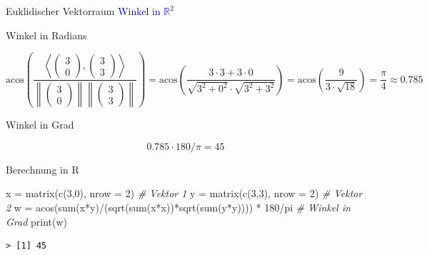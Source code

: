 \documentclass[
  8pt,
  ignorenonframetext,
]{beamer}
\newenvironment{Shaded}{\begin{snugshade}}{\end{snugshade}}
\newcommand{\AttributeTok}[1]{\textcolor[rgb]{0.77,0.63,0.00}{#1}}
\newcommand{\CommentTok}[1]{\textcolor[rgb]{0.56,0.35,0.01}{\textit{#1}}}
\newcommand{\DecValTok}[1]{\textcolor[rgb]{0.00,0.00,0.81}{#1}}
\newcommand{\FunctionTok}[1]{\textcolor[rgb]{0.00,0.00,0.00}{#1}}
\newcommand{\NormalTok}[1]{#1}
\newcommand{\OtherTok}[1]{\textcolor[rgb]{0.56,0.35,0.01}{#1}}
\newcommand{\SpecialCharTok}[1]{\textcolor[rgb]{0.00,0.00,0.00}{#1}}
\begin{document}
\begin{frame}[fragile]{Euklidischer Vektorraum}
\protect\hypertarget{euklidischer-vektorraum-10}{}
\textcolor{darkblue}{Winkel in $\mathbb{R}^2$}

\footnotesize

Winkel in Radians

\tiny

\begin{equation}
\mbox{acos}
\left(\frac{\left\langle \begin{pmatrix} 3 \\ 0 \end{pmatrix}, \begin{pmatrix} 3 \\ 3 \end{pmatrix} \right\rangle}
           {\left\lVert  \begin{pmatrix} 3 \\ 0 \end{pmatrix} \right\rVert \left\lVert \begin{pmatrix} 3 \\ 3 \end{pmatrix} \right\rVert}
\right)
= \mbox{acos}
\left(\frac{3\cdot 3 + 3 \cdot 0}
           {\sqrt{3^2 + 0^2} \cdot \sqrt{3^2 + 3^2}}
\right)
= \mbox{acos}
\left(\frac{9}
           {3 \cdot \sqrt{18}}
\right)
= \frac{\pi}{4}
\approx 0.785
\end{equation}

\footnotesize

Winkel in Grad

\begin{equation}
0.785 \cdot 180/\pi = 45
\end{equation}

Berechnung in R

\begin{Shaded}
\begin{Highlighting}[]
\NormalTok{x }\OtherTok{=} \FunctionTok{matrix}\NormalTok{(}\FunctionTok{c}\NormalTok{(}\DecValTok{3}\NormalTok{,}\DecValTok{0}\NormalTok{), }\AttributeTok{nrow =} \DecValTok{2}\NormalTok{)                                 }\CommentTok{\# Vektor 1}
\NormalTok{y }\OtherTok{=} \FunctionTok{matrix}\NormalTok{(}\FunctionTok{c}\NormalTok{(}\DecValTok{3}\NormalTok{,}\DecValTok{3}\NormalTok{), }\AttributeTok{nrow =} \DecValTok{2}\NormalTok{)                                 }\CommentTok{\# Vektor 2}
\NormalTok{w }\OtherTok{=} \FunctionTok{acos}\NormalTok{(}\FunctionTok{sum}\NormalTok{(x}\SpecialCharTok{*}\NormalTok{y)}\SpecialCharTok{/}\NormalTok{(}\FunctionTok{sqrt}\NormalTok{(}\FunctionTok{sum}\NormalTok{(x}\SpecialCharTok{*}\NormalTok{x))}\SpecialCharTok{*}\FunctionTok{sqrt}\NormalTok{(}\FunctionTok{sum}\NormalTok{(y}\SpecialCharTok{*}\NormalTok{y)))) }\SpecialCharTok{*} \DecValTok{180}\SpecialCharTok{/}\NormalTok{pi  }\CommentTok{\# Winkel in Grad}
\FunctionTok{print}\NormalTok{(w)}
\end{Highlighting}
\end{Shaded}

\begin{verbatim}
> [1] 45
\end{verbatim}
\end{frame}
\end{document}
